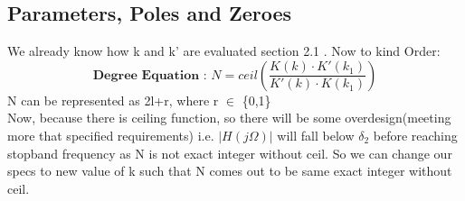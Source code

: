 \documentclass{article}
\begin{document}
\subsection{Parameters, Poles and Zeroes}
We already know how k and k' are evaluated section 2.1 . Now to kind Order:\\
\begin{equation}
    \textbf{Degree Equation : }N = ceil({\frac{K(k)\cdot K'(k_1)}{K'(k)\cdot K(k_1)}})
\end{equation}
N can be represented as 2l+r, where r $\in$ \{0,1\}\\
Now, because there is ceiling function,  so there will be some overdesign(meeting more that specified requirements) i.e. $|H(j\Omega)|$ will fall below $\delta_2$ before reaching stopband frequency as N is not exact integer without ceil. So we can change our specs to new value of k such that N comes out to be same exact integer without ceil. 
\end{document}
